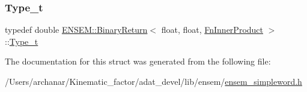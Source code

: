 \mbox{\label{structENSEM_1_1BinaryReturn_3_01float_00_01float_00_01FnInnerProduct_01_4_a9c257dea59acd1d92cfa3d929aa8ab4b}} 
\subsubsection{\texorpdfstring{Type\_t}{Type\_t}\hspace{0.1cm}{\footnotesize\ttfamily [2/2]}}
{\footnotesize\ttfamily typedef double \mbox{\hyperlink{structENSEM_1_1BinaryReturn}{E\+N\+S\+E\+M\+::\+Binary\+Return}}$<$ float, float, \mbox{\hyperlink{structENSEM_1_1FnInnerProduct}{Fn\+Inner\+Product}} $>$\+::\mbox{\hyperlink{structENSEM_1_1BinaryReturn_3_01float_00_01float_00_01FnInnerProduct_01_4_a9c257dea59acd1d92cfa3d929aa8ab4b}{Type\+\_\+t}}}



The documentation for this struct was generated from the following file\+:\begin{DoxyCompactItemize}
\item 
/\+Users/archanar/\+Kinematic\+\_\+factor/adat\+\_\+devel/lib/ensem/\mbox{\hyperlink{lib_2ensem_2ensem__simpleword_8h}{ensem\+\_\+simpleword.\+h}}\end{DoxyCompactItemize}
